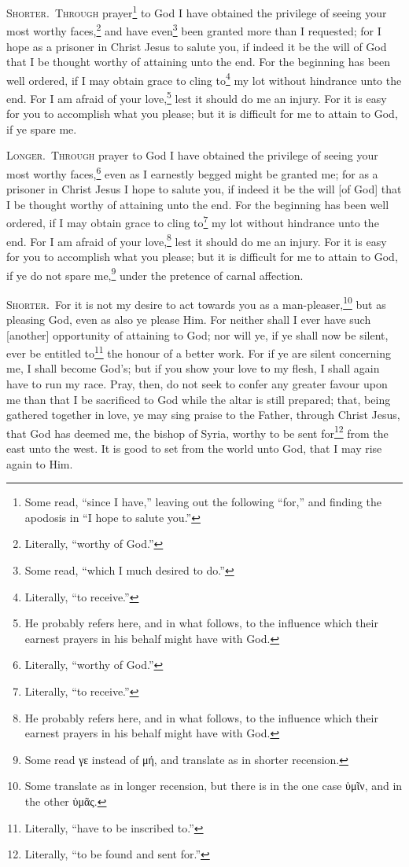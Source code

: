 \textsc{Shorter.}~\textsc{Through} prayer\footnote{Some read, “since I have,” leaving out the following “for,” and finding the apodosis in “I hope to salute you.”} to God I have obtained the privilege of seeing your most worthy faces,\footnote{Literally, “worthy of God.”} and have even\footnote{Some read, “which I much desired to do.”} been granted more than I requested; for I hope as a prisoner in Christ Jesus to salute you, if indeed it be the will of God that I be thought worthy of attaining unto the end. For the beginning has been well ordered,  if I may obtain grace to cling to\footnote{Literally, “to receive.”} my lot without hindrance unto the end. For I am afraid of your love,\footnote{He probably refers here, and in what follows, to the influence which their earnest prayers in his behalf might have with God.} lest it should do me an injury. For it is easy for you to accomplish what you please; but it is difficult for me to attain to God, if ye spare me.

\textsc{Longer.}~\textsc{Through} prayer to God I have obtained the privilege of seeing your most worthy faces,\footnote{Literally, “worthy of God.”} even as I earnestly begged might be granted me; for as a prisoner in Christ Jesus I hope to salute you, if indeed it be the will [of God] that I be thought worthy of attaining unto the end. For the beginning has been well ordered, if I may obtain grace to cling to\footnote{Literally, “to receive.”} my lot without hindrance unto the end. For I am afraid of your love,\footnote{He probably refers here, and in what follows, to the influence which their earnest prayers in his behalf might have with God.} lest it should do me an injury. For it is easy for you to accomplish what you please; but it is difficult for me to attain to God, if ye do not spare me,\footnote{Some read \textgreek{γε} instead of \textgreek{μή}, and translate as in shorter recension.} under the pretence of carnal affection.


\textsc{Shorter.}~For it is not my desire to act towards you as a man-pleaser,\footnote{Some translate as in longer recension, but there is in the one case \textgreek{ὑμῖν}, and in the other \textgreek{ὑμᾶς}.} but as pleasing God, even as also ye please Him. For neither shall I ever have such [another] opportunity of attaining to God; nor will ye, if ye shall now be silent, ever be entitled to\footnote{Literally, “have to be inscribed to.”} the honour of a better work. For if ye are silent concerning me, I shall become God’s; but if you show your love to my flesh, I shall again have to run my race. Pray, then, do not seek to confer any greater favour upon me than that I be sacrificed to God while the altar is still prepared; that, being gathered together in love, ye may sing praise to the Father, through Christ Jesus, that God has deemed me, the bishop of Syria, worthy to be sent for\footnote{Literally, “to be found and sent for.”} from the east unto the west. It is good to set from the world unto God, that I may rise again to Him.


